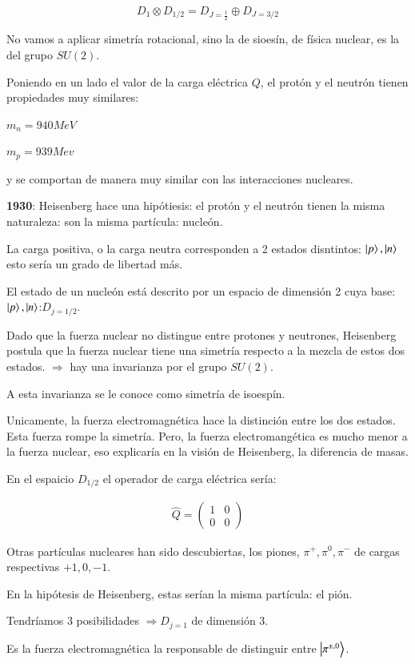 $$
    D_1\otimes D_{1/2}=D_{J=\frac{1}{2}}\oplus D_{J=3/2}
$$

No vamos a aplicar simetría rotacional, sino la de sioesín, de física nuclear, es la del grupo $SU(2)$.

Poniendo en un lado el valor de la carga eléctrica $Q$, el protón y el neutrón tienen propiedades muy similares:

$m_n=940MeV$

$m_p=939Mev$

y se comportan de manera muy similar con las interacciones nucleares.

\textbf{1930}: Heisenberg hace una hipótiesis: el protón y el neutrón tienen la misma naturaleza: son la misma partícula: nucleón.

La carga positiva, o la carga neutra corresponden a 2 estados disntintos: $\ket{p},\ket{n}$ esto sería un grado de libertad más.

El estado de un nucleón está descrito por un espacio de dimensión 2 cuya base: $\ket{p},\ket{n}$:$D_{j=1/2}$.

Dado que la fuerza nuclear no distingue entre protones y neutrones, Heisenberg postula que la fuerza nuclear tiene una simetría respecto a la mezcla de estos dos estados.
$\Rightarrow$ hay una invarianza por el grupo $SU(2)$.

A esta invarianza se le conoce como simetría de isoespín.

Unicamente, la fuerza electromagnética hace la distinción entre los dos estados. Esta fuerza rompe la simetría. Pero, la fuerza electromangética es mucho menor a la fuerza nuclear, eso explicaría en la visión de Heisenberg, la diferencia de masas.

En el espaicio $D_{1/2}$ el operador de carga eléctrica sería:

\begin{align*}
    \hat{Q}=\begin{pmatrix}
        1&0\\0&0
    \end{pmatrix}
\end{align*}

Otras partículas nucleares han sido descubiertas, los piones, $\pi^+,\pi^0,\pi^-$ de cargas respectivas $+1,0,-1$.

En la hipótesis de Heisenberg, estas serían la misma partícula: el pión.

Tendríamos 3 posibilidades $\Rightarrow D_{j=1}$ de dimensión 3.

Es la fuerza electromagnética la responsable de distinguir entre $\ket{\pi^{\pm,0}}$.

